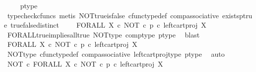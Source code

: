 \begin{isabellebody}
\ \ \ \isamarkupfalse%
\ p{\isacharunderscore}{\kern0pt}type\ \isamarkupfalse%
\ {\isacharparenleft}{\kern0pt}typecheck{\isacharunderscore}{\kern0pt}cfuncs{\isacharcomma}{\kern0pt}\ metis\ NOT{\isacharunderscore}{\kern0pt}true{\isacharunderscore}{\kern0pt}is{\isacharunderscore}{\kern0pt}false\ cfunc{\isacharunderscore}{\kern0pt}type{\isacharunderscore}{\kern0pt}def\ comp{\isacharunderscore}{\kern0pt}associative\ exists{\isacharunderscore}{\kern0pt}p{\isacharunderscore}{\kern0pt}true\ true{\isacharunderscore}{\kern0pt}false{\isacharunderscore}{\kern0pt}distinct{\isacharparenright}{\kern0pt}\isanewline
\ \isamarkupfalse%
\ \isamarkupfalse%
\ {\isachardoublequoteopen}FORALL\ X\ {\isasymcirc}\isactrlsub c\ {\isacharparenleft}{\kern0pt}{\isacharparenleft}{\kern0pt}NOT\ {\isasymcirc}\isactrlsub c\ p{\isacharparenright}{\kern0pt}\ {\isasymcirc}\isactrlsub c\ left{\isacharunderscore}{\kern0pt}cart{\isacharunderscore}{\kern0pt}proj\ X\ {\isasymone}{\isacharparenright}{\kern0pt}\isactrlsup {\isasymsharp}\ {\isasymnoteq}\ {\isasymt}{\isachardoublequoteclose}\isanewline
\ \ \ \isamarkupfalse%
\ FORALL{\isacharunderscore}{\kern0pt}true{\isacharunderscore}{\kern0pt}implies{\isacharunderscore}{\kern0pt}all{\isacharunderscore}{\kern0pt}true\ NOT{\isacharunderscore}{\kern0pt}type\ comp{\isacharunderscore}{\kern0pt}type\ p{\isacharunderscore}{\kern0pt}type\ \isamarkupfalse%
\ blast\isanewline
\ \isamarkupfalse%
\ \isamarkupfalse%
\ {\isachardoublequoteopen}FORALL\ X\ {\isasymcirc}\isactrlsub c\ {\isacharparenleft}{\kern0pt}NOT\ {\isasymcirc}\isactrlsub c\ p\ {\isasymcirc}\isactrlsub c\ left{\isacharunderscore}{\kern0pt}cart{\isacharunderscore}{\kern0pt}proj\ X\ {\isasymone}{\isacharparenright}{\kern0pt}\isactrlsup {\isasymsharp}\ {\isasymnoteq}\ {\isasymt}{\isachardoublequoteclose}\isanewline
\ \ \ \isamarkupfalse%
\ NOT{\isacharunderscore}{\kern0pt}type\ cfunc{\isacharunderscore}{\kern0pt}type{\isacharunderscore}{\kern0pt}def\ comp{\isacharunderscore}{\kern0pt}associative\ left{\isacharunderscore}{\kern0pt}cart{\isacharunderscore}{\kern0pt}proj{\isacharunderscore}{\kern0pt}type\ p{\isacharunderscore}{\kern0pt}type\ \isamarkupfalse%
\ auto\isanewline
\ \isamarkupfalse%
\ \isamarkupfalse%
\ {\isachardoublequoteopen}NOT\ {\isasymcirc}\isactrlsub c\ FORALL\ X\ {\isasymcirc}\isactrlsub c\ {\isacharparenleft}{\kern0pt}NOT\ {\isasymcirc}\isactrlsub c\ p\ {\isasymcirc}\isactrlsub c\ left{\isacharunderscore}{\kern0pt}cart{\isacharunderscore}{\kern0pt}proj\ X\ {\isasymone}{\isacharparenright}{\kern0pt}\isactrlsup {\isasymsharp}\ {\isacharequal}{\kern0pt}\ {\isasymt}{\isachardoublequoteclose}\isanewline

\end{isabellebody}
